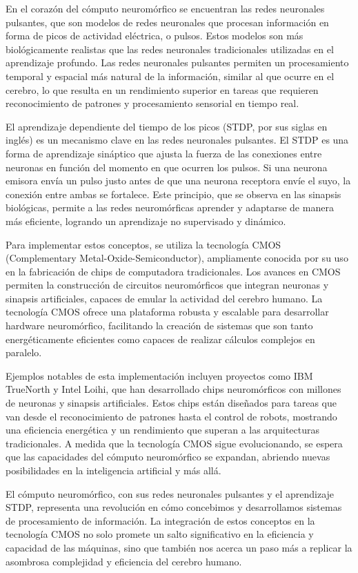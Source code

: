 \documentclass[conference]{IEEEtran}
\begin{document}
En el corazón del cómputo neuromórfico se encuentran las redes neuronales pulsantes, que son modelos de redes neuronales que procesan información en forma de picos de actividad eléctrica, o pulsos. Estos modelos son más biológicamente realistas que las redes neuronales tradicionales utilizadas en el aprendizaje profundo. Las redes neuronales pulsantes permiten un procesamiento temporal y espacial más natural de la información, similar al que ocurre en el cerebro, lo que resulta en un rendimiento superior en tareas que requieren reconocimiento de patrones y procesamiento sensorial en tiempo real.

El aprendizaje dependiente del tiempo de los picos (STDP, por sus siglas en inglés) es un mecanismo clave en las redes neuronales pulsantes. El STDP es una forma de aprendizaje sináptico que ajusta la fuerza de las conexiones entre neuronas en función del momento en que ocurren los pulsos. Si una neurona emisora envía un pulso justo antes de que una neurona receptora envíe el suyo, la conexión entre ambas se fortalece. Este principio, que se observa en las sinapsis biológicas, permite a las redes neuromórficas aprender y adaptarse de manera más eficiente, logrando un aprendizaje no supervisado y dinámico.

Para implementar estos conceptos, se utiliza la tecnología CMOS (Complementary Metal-Oxide-Semiconductor), ampliamente conocida por su uso en la fabricación de chips de computadora tradicionales. Los avances en CMOS permiten la construcción de circuitos neuromórficos que integran neuronas y sinapsis artificiales, capaces de emular la actividad del cerebro humano. La tecnología CMOS ofrece una plataforma robusta y escalable para desarrollar hardware neuromórfico, facilitando la creación de sistemas que son tanto energéticamente eficientes como capaces de realizar cálculos complejos en paralelo.

Ejemplos notables de esta implementación incluyen proyectos como IBM TrueNorth y Intel Loihi, que han desarrollado chips neuromórficos con millones de neuronas y sinapsis artificiales. Estos chips están diseñados para tareas que van desde el reconocimiento de patrones hasta el control de robots, mostrando una eficiencia energética y un rendimiento que superan a las arquitecturas tradicionales. A medida que la tecnología CMOS sigue evolucionando, se espera que las capacidades del cómputo neuromórfico se expandan, abriendo nuevas posibilidades en la inteligencia artificial y más allá.

El cómputo neuromórfico, con sus redes neuronales pulsantes y el aprendizaje STDP, representa una revolución en cómo concebimos y desarrollamos sistemas de procesamiento de información. La integración de estos conceptos en la tecnología CMOS no solo promete un salto significativo en la eficiencia y capacidad de las máquinas, sino que también nos acerca un paso más a replicar la asombrosa complejidad y eficiencia del cerebro humano.
\end{document}

